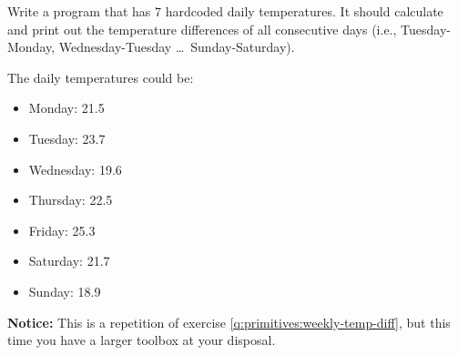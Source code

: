 Write a program that has 7 hardcoded daily temperatures. It should calculate and print out the temperature differences of all consecutive days (i.e., Tuesday-Monday, Wednesday-Tuesday \ldots\ Sunday-Saturday).

The daily temperatures could be:

\begin{itemize}
  \item Monday: 21.5
  \item Tuesday: 23.7
  \item Wednesday: 19.6
  \item Thursday: 22.5
  \item Friday: 25.3
  \item Saturday: 21.7
  \item Sunday: 18.9
\end{itemize}

\textbf{Notice:} This is a repetition of exercise \ref{q:primitives:weekly-temp-diff}, but this time you have a larger toolbox at your disposal.
